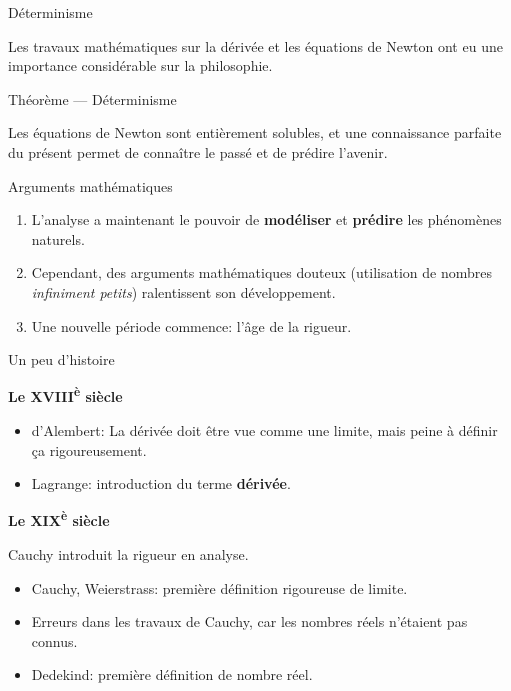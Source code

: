 \documentclass{beamer}
\begin{document}
\begin{frame}
    {Déterminisme}

    Les travaux mathématiques sur la dérivée et les équations de Newton
    ont eu une importance considérable sur la philosophie.
    \begin{exampleblock}
        {Théorème --- Déterminisme}

        Les équations de Newton sont entièrement solubles,
        et une connaissance parfaite du présent permet de connaître le passé et de prédire l'avenir.
    \end{exampleblock}
\end{frame}

\begin{frame}
    {Arguments mathématiques}
    \begin{enumerate}
        \item L'analyse a maintenant le pouvoir de \textbf{modéliser} et \textbf{prédire} les phénomènes naturels.
            \pause{}
        \item Cependant, des arguments mathématiques douteux
            (utilisation de nombres \emph{infiniment petits})
            ralentissent son développement.
            \pause{}
        \item Une nouvelle période commence: l'âge de la rigueur.
    \end{enumerate}
\end{frame}

\begin{frame}
    {Un peu d'histoire}

    \textbf{Le XVIII\textsuperscript{è} siècle}
    \begin{itemize}
        \item d'Alembert: La dérivée doit être vue comme une limite,
            mais peine à définir ça rigoureusement.
            \pause{}
        \item Lagrange: introduction du terme \textbf{dérivée}.
    \end{itemize}
    \pause{}

    \textbf{Le XIX\textsuperscript{è} siècle}

    Cauchy introduit la rigueur en analyse.

    \begin{itemize}
        \item Cauchy, Weierstrass: première définition rigoureuse de limite.
            \pause{}
        \item Erreurs dans les travaux de Cauchy,
            car les nombres réels n'étaient pas connus.
            \pause{}
        \item Dedekind: première définition de nombre réel.
    \end{itemize}
\end{frame}
\end{document}
